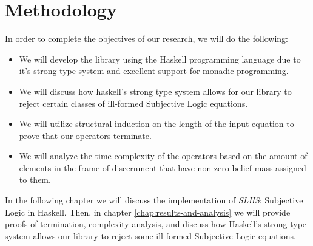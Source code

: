 \documentclass[thesis.tex]{subfiles}
\begin{document}
\section{Methodology}

In order to complete the objectives of our research, we will do the following:

\begin{itemize}
  \item We will develop the library using the Haskell programming language due to it's strong type
system and excellent support for monadic programming.
  \item We will discuss how haskell's strong type system allows for our library to reject certain
classes of ill-formed Subjective Logic equations.
  \item We will utilize structural induction on the length of the input equation to prove that
our operators terminate.
  \item We will analyze the time complexity of the operators based on the amount of elements in the
frame of discernment that have non-zero belief mass assigned to them.
\end{itemize}

In the following chapter we will discuss the implementation of \emph{SLHS}: Subjective Logic in Haskell.
Then, in chapter \ref{chap:results-and-analysis} we will provide proofs of termination, complexity
analysis, and discuss how Haskell's strong type system allows our library to reject some ill-formed
Subjective Logic equations.
\end{document}

